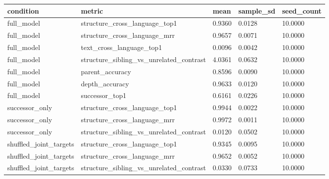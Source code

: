 \begin{tabular}{lllll}
 \hline
condition & metric & mean & sample\_sd & seed\_count \\
 \hline
full\_model & structure\_cross\_language\_top1 & 0.9360 & 0.0128 & 10.0000 \\
full\_model & structure\_cross\_language\_mrr & 0.9657 & 0.0071 & 10.0000 \\
full\_model & text\_cross\_language\_top1 & 0.0096 & 0.0042 & 10.0000 \\
full\_model & structure\_sibling\_vs\_unrelated\_contrast & 4.0361 & 0.0632 & 10.0000 \\
full\_model & parent\_accuracy & 0.8596 & 0.0090 & 10.0000 \\
full\_model & depth\_accuracy & 0.9633 & 0.0120 & 10.0000 \\
full\_model & successor\_top1 & 0.6161 & 0.0226 & 10.0000 \\
successor\_only & structure\_cross\_language\_top1 & 0.9944 & 0.0022 & 10.0000 \\
successor\_only & structure\_cross\_language\_mrr & 0.9972 & 0.0011 & 10.0000 \\
successor\_only & structure\_sibling\_vs\_unrelated\_contrast & 0.0120 & 0.0502 & 10.0000 \\
shuffled\_joint\_targets & structure\_cross\_language\_top1 & 0.9345 & 0.0095 & 10.0000 \\
shuffled\_joint\_targets & structure\_cross\_language\_mrr & 0.9652 & 0.0052 & 10.0000 \\
shuffled\_joint\_targets & structure\_sibling\_vs\_unrelated\_contrast & 0.0330 & 0.0733 & 10.0000 \\
 \hline
\end{tabular}

